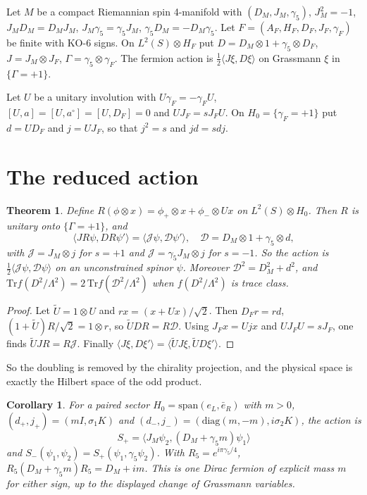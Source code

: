 \documentclass[aps,prd,reprint,onecolumn,nofootinbib,amsmath,amssymb,floatfix]{revtex4-2}
\theoremstyle{plain}
\newtheorem{theorem}{Theorem}
\newtheorem{corollary}{Corollary}
\begin{document}
Let $M$ be a compact Riemannian spin 4-manifold with $(D_M,J_M,\gamma_5)$, $J_M^2=-1$, $J_MD_M=D_MJ_M$, $J_M\gamma_5=\gamma_5J_M$, $\gamma_5D_M=-D_M\gamma_5$. Let $F=(A_F,H_F,D_F,J_F,\gamma_F)$ be finite with KO-6 signs. On $L^2(S)\otimes H_F$ put $D=D_M\otimes1+\gamma_5\otimes D_F$, $J=J_M\otimes J_F$, $\Gamma=\gamma_5\otimes\gamma_F$. The fermion action is $\tfrac12\langle J\xi,D\xi\rangle$ on Grassmann $\xi$ in $\{\Gamma=+1\}$.

Let $U$ be a unitary involution with $U\gamma_F=-\gamma_FU$, $[U,a]=[U,a^\circ]=[U,D_F]=0$ and $UJ_F=sJ_FU$. On $H_0=\{\gamma_F=+1\}$ put $d=UD_F$ and $j=UJ_F$, so that $j^2=s$ and $jd=sdj$.

\section{The reduced action}

\begin{theorem}
Define $R(\phi\otimes x)=\phi_+\otimes x+\phi_-\otimes Ux$ on $L^2(S)\otimes H_0$. Then $R$ is unitary onto $\{\Gamma=+1\}$, and
\begin{equation}
\langle JR\psi,DR\psi'\rangle=\langle\mathcal J\psi,\mathcal D\psi'\rangle,\quad \mathcal D=D_M\otimes1+\gamma_5\otimes d,
\end{equation}
with $\mathcal J=J_M\otimes j$ for $s=+1$ and $\mathcal J=\gamma_5J_M\otimes j$ for $s=-1$. So the action is $\tfrac12\langle\mathcal J\psi,\mathcal D\psi\rangle$ on an unconstrained spinor $\psi$. Moreover $\mathcal D^2=D_M^2+d^2$, and $\mathrm{Tr}f(D^2/\Lambda^2)=2\,\mathrm{Tr}f(\mathcal D^2/\Lambda^2)$ when $f(D^2/\Lambda^2)$ is trace class.
\end{theorem}

\begin{proof}
Let $\tilde U=1\otimes U$ and $rx=(x+Ux)/\sqrt2$. Then $D_Fr=rd$, $(1+\tilde U)R/\sqrt2=1\otimes r$, so $\tilde UDR=R\mathcal D$. Using $J_Fx=Ujx$ and $UJ_FU=sJ_F$, one finds $\tilde UJR=R\mathcal J$. Finally $\langle J\xi,D\xi'\rangle=\langle\tilde UJ\xi,\tilde UD\xi'\rangle$.
\end{proof}

So the doubling is removed by the chirality projection, and the physical space is exactly the Hilbert space of the odd product.

\begin{corollary}
For a paired sector $H_0=\mathrm{span}(e_L,\bar e_R)$ with $m>0$, $(d_+,j_+)=(mI,\sigma_1K)$ and $(d_-,j_-)=(\mathrm{diag}(m,-m),i\sigma_2K)$, the action is
\begin{equation}
S_+=\langle J_M\psi_2,(D_M+\gamma_5m)\psi_1\rangle
\end{equation}
and $S_-(\psi_1,\psi_2)=S_+(\psi_1,\gamma_5\psi_2)$. With $R_5=e^{i\pi\gamma_5/4}$, $R_5(D_M+\gamma_5m)R_5=D_M+im$. This is one Dirac fermion of explicit mass $m$ for either sign, up to the displayed change of Grassmann variables.
\end{corollary}
\end{document}
